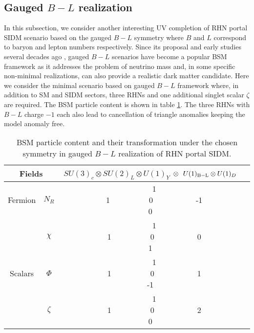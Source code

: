 \documentclass[prd,nofootinbib,preprint,superscriptaddress]{revtex4}
\begin{document}
\subsection{Gauged $B-L$ realization}
In this subsection, we consider another interesting UV completion of RHN portal SIDM scenario based on the gauged $B-L$ symmetry where $B$ and $L$ correspond to baryon and lepton numbers respectively. Since its proposal and early studies several decades ago \cite{Davidson:1978pm, Mohapatra:1980qe, Marshak:1979fm, Masiero:1982fi, Mohapatra:1982xz, Buchmuller:1991ce}, gauged $B-L$ scenarios have become a popular BSM framework as it addresses the problem of neutrino mass and, in some specific non-minimal realizations, can also provide a realistic dark matter candidate. Here we consider the minimal scenario based on gauged $B-L$ framework where, in addition to SM and SIDM sectors, three RHNs and one additional singlet scalar $\zeta$ are required. The BSM particle content is shown in table \ref{tab:tab3}. The three RHNs with $B-L$ charge $-1$ each also lead to cancellation of triangle anomalies keeping the model anomaly free.

\begin{table}[h!]
	\begin{tabular}{|c|c|c|c|}
		\hline \multicolumn{2}{|c}{Fields}&  \multicolumn{1}{|c|}{ $ SU(3)_c \otimes SU(2)_L \otimes U(1)_Y$ $\otimes~~U(1)_{\rm B-L} \otimes  U(1)_D $  } \\ \hline
		{Fermion} &  $N_R$&  ~~1 ~~~~~~~~~~~1~~~~~~~~~~0~~~~~~~~~~~-1~~~~~~~~~ 0 \\ %
		& $\chi$  & ~~1 ~~~~~~~~~~~1~~~~~~~~~~0~~~~~~~~~~~0~~~~~~~~~ 1 \\
		[0.5em] \cline{2-3}
		\hline
		Scalars & 
		$\Phi$ & ~~1 ~~~~~~~~~~~1~~~~~~~~~~0~~~~~~~~~~~1~~~~~~~~~ -1 \\
		& $\zeta$ & ~~1 ~~~~~~~~~~~1~~~~~~~~~~0~~~~~~~~~~~2~~~~~~~~~ 0 \\
		\hline
	\end{tabular}
\caption{BSM particle content and their transformation under the chosen symmetry in gauged $B-L$ realization of RHN portal SIDM.}
\label{tab:tab3}
\end{table}
\end{document}
